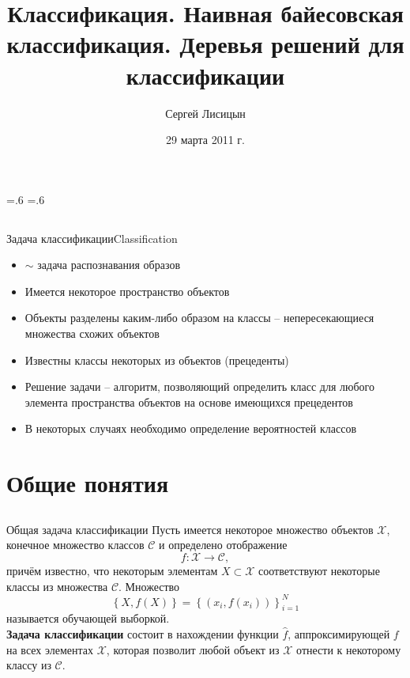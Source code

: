 \documentclass[compress,red,unicode]{beamer}
\title[Машинное обучение]{Классификация. Наивная байесовская классификация. Деревья решений для классификации}
\author{Сергей Лисицын}
\institute{lisitsyn.s.o@gmail.com}
\date{29 марта 2011 г.}
\newcommand{\bfc}{\bf\color{main!30!black}}
\begin{document}
\section{}
\abovedisplayskip=.6\abovedisplayskip
\belowdisplayskip=.6\belowdisplayskip

\begin{frame}

\titlepage
\end{frame}




\subsection{}

\begin{frame}{Задача классификации}{Classification}
\begin{itemize}
	\item $\sim$ задача распознавания образов
	\item Имеется некоторое пространство объектов
	\item Объекты разделены каким-либо образом на классы -- непересекающиеся множества схожих объектов
	\item Известны классы некоторых из объектов (прецеденты)
	\item Решение задачи -- алгоритм, позволяющий определить класс для любого элемента пространства объектов на основе имеющихся прецедентов
	\item В некоторых случаях необходимо определение вероятностей классов
\end{itemize}
\end{frame}

\section{Общие понятия}
\subsection{}
\begin{frame}{Общая задача классификации}
Пусть имеется некоторое множество объектов $\mathcal{X}$, конечное множество классов $\mathcal{C}$ и определено отображение
$$
f: \mathcal{X} \to \mathcal{C},
$$
причём известно, что некоторым элементам $X \subset \mathcal{X}$ соответствуют некоторые классы из множества $\mathcal{C}$. Множество
$$
\left \{ X, f(X) \right\} = \left\{ ( x_i, f (x_i) ) \right\}_{i=1}^{N}
$$ 
называется обучающей выборкой.\\[0.5cm]
{\bfc Задача классификации} состоит в нахождении функции $\hat f$, аппроксимирующей $f$ на всех элементах $\mathcal{X}$, которая позволит любой объект из $\mathcal{X}$ отнести к некоторому классу из $\mathcal{C}$.
\end{frame}
\end{document}
